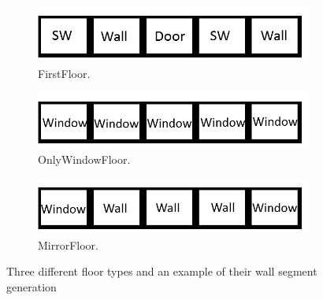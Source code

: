 \begin{figure}[H]
  \centering
  \begin{subfigure}[b]{0.32\textwidth}
    \includegraphics[width=\textwidth]{figure/FirstFloor.png}
    \caption{FirstFloor.}
  \end{subfigure}
  \quad
  \begin{subfigure}[b]{0.32\textwidth}
    \includegraphics[width=\textwidth]{figure/OnlyWindowFloor.png}
    \caption{OnlyWindowFloor.}
  \end{subfigure}
  \begin{subfigure}[b]{0.32\textwidth}
    \includegraphics[width=\textwidth]{figure/MirrorFloor.png}
    \caption{MirrorFloor.}
  \end{subfigure}

  \caption{Three different floor types and an example of their wall segment generation}
  \label{fig:segmentsgen}
\end{figure}
